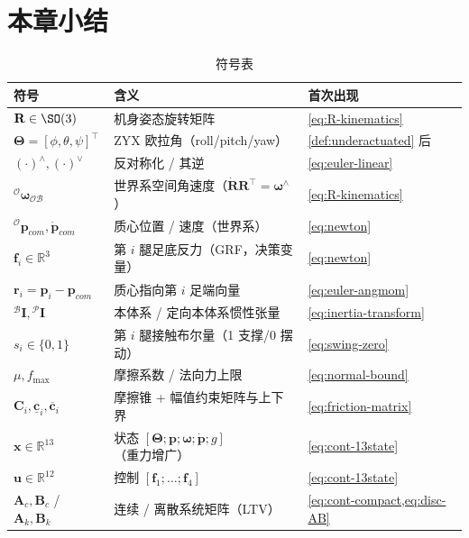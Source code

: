 \section*{本章小结}

\begin{table}[H]\centering\small
\caption{符号表}
\begin{tabular}{lll}
\toprule
符号 & 含义 & 首次出现 \\
\midrule
$\mathbf{R}\in\SO(3)$ & 机身姿态旋转矩阵 & \cref{eq:R-kinematics} \\
$\boldsymbol{\Theta}=[\phi,\theta,\psi]^\top$ & ZYX 欧拉角（roll/pitch/yaw） & \cref{def:underactuated} 后 \\
$(\cdot)^\wedge,(\cdot)^\vee$ & 反对称化 / 其逆 & \cref{eq:euler-linear} \\
${}^{\mathcal{O}}\boldsymbol{\omega}_{\mathcal{OB}}$ & 世界系空间角速度（$\dot{\mathbf{R}}\mathbf{R}^\top=\boldsymbol{\omega}^\wedge$） & \cref{eq:R-kinematics} \\
${}^{\mathcal{O}}\boldsymbol{p}_{com},\dot{\boldsymbol{p}}_{com}$ & 质心位置 / 速度（世界系） & \cref{eq:newton} \\
$\mathbf{f}_i\in\mathbb{R}^3$ & 第 $i$ 腿足底反力（GRF，决策变量） & \cref{eq:newton} \\
$\boldsymbol{r}_i=\boldsymbol{p}_i-\boldsymbol{p}_{com}$ & 质心指向第 $i$ 足端向量 & \cref{eq:euler-angmom} \\
${}^{\mathcal{B}}\mathbf{I},{}^{\mathcal{P}}\mathbf{I}$ & 本体系 / 定向本体系惯性张量 & \cref{eq:inertia-transform} \\
$s_i\in\{0,1\}$ & 第 $i$ 腿接触布尔量（1 支撑/0 摆动） & \cref{eq:swing-zero} \\
$\mu,f_{\max}$ & 摩擦系数 / 法向力上限 & \cref{eq:normal-bound} \\
$\mathbf{C}_i,\underline{\mathbf{c}}_i,\overline{\mathbf{c}}_i$ & 摩擦锥 + 幅值约束矩阵与上下界 & \cref{eq:friction-matrix} \\
$\boldsymbol{x}\in\mathbb{R}^{13}$ & 状态 $[\boldsymbol{\Theta};\boldsymbol{p};\boldsymbol{\omega};\dot{\boldsymbol{p}};g]$（重力增广） & \cref{eq:cont-13state} \\
$\boldsymbol{u}\in\mathbb{R}^{12}$ & 控制 $[\mathbf{f}_1;\dots;\mathbf{f}_4]$ & \cref{eq:cont-13state} \\
$\mathbf{A}_c,\mathbf{B}_c$ / $\mathbf{A}_k,\mathbf{B}_k$ & 连续 / 离散系统矩阵（LTV） & \cref{eq:cont-compact,eq:disc-AB} \\

\end{tabular}
\end{table}
